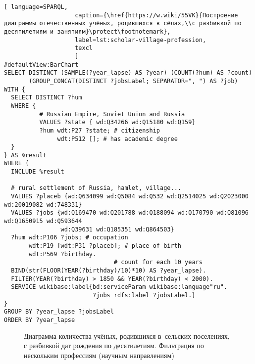 \newpage
\begin{lstlisting}[ language=SPARQL, 
                    caption={\href{https://w.wiki/55VK}{Построение диаграммы отечественных учёных, родившихся в сёлах,\\с разбивкой по десятилетиям и занятиям}\protect\footnotemark},
                    label=lst:scholar-village-profession,
                    texcl 
                    ]
#defaultView:BarChart
SELECT DISTINCT (SAMPLE(?year_lapse) AS ?year) (COUNT(?hum) AS ?count) 
       (GROUP_CONCAT(DISTINCT ?jobsLabel; SEPARATOR=", ") AS ?job) 
WITH {
  SELECT DISTINCT ?hum 
  WHERE {
          # Russian Empire, Soviet Union and Russia
          VALUES ?state { wd:Q34266 wd:Q15180 wd:Q159}
          ?hum wdt:P27 ?state; # citizenship
               wdt:P512 []; # has academic degree 
  }
} AS %result
WHERE {
  INCLUDE %result

  # rural settlement of Russia, hamlet, village...
  VALUES ?placeb {wd:Q634099 wd:Q5084 wd:Q532 wd:Q2514025 wd:Q2023000 wd:20019082 wd:748331}
  VALUES ?jobs {wd:Q169470 wd:Q201788 wd:Q188094 wd:Q170790 wd:Q81096 wd:Q1650915 wd:Q593644 
                wd:Q39631 wd:Q185351 wd:Q864503}
  ?hum wdt:P106 ?jobs; # occupation
       wdt:P19 [wdt:P31 ?placeb]; # place of birth
       wdt:P569 ?birthday.
                               # count for each 10 years
  BIND(str(FLOOR(YEAR(?birthday)/10)*10) AS ?year_lapse). 
  FILTER(YEAR(?birthday) > 1850 && YEAR(?birthday) < 2000).
  SERVICE wikibase:label{bd:serviceParam wikibase:language"ru".
                         ?jobs rdfs:label ?jobsLabel.}
}
GROUP BY ?year_lapse ?jobsLabel
ORDER BY ?year_lapse
\end{lstlisting}%


\newpage
\begin{figure*}
    \setlength{\fboxsep}{0pt}%
    \setlength{\fboxrule}{1pt}%
	\label{fig:scholars-village-color}
    \caption[Диаграмма количества учёных по родам деятельности, родившихся в сёлах, 2022 год.]{Диаграмма количества учёных, родившихся в~сельских поселениях, с разбивкой дат рождения по десятилетиям. Фильтрация по нескольким профессиям (научным направлениям)}%
\end{figure*} 



